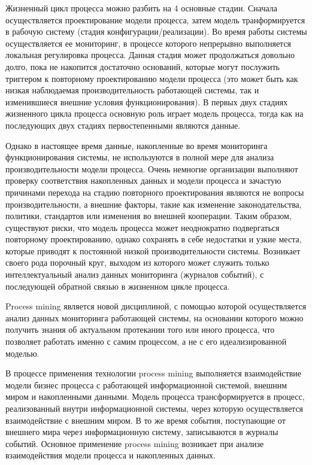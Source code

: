 \documentclass[
11pt,%
tightenlines,%
twoside,%
onecolumn,%
nofloats,%
nobibnotes,%
nofootinbib,%
superscriptaddress,%
noshowpacs,%
centertags]%
{revtex4}
\begin{document}
Жизненный цикл процесса можно разбить на 4 основные стадии.
Сначала осуществляется проектирование модели процесса, затем модель транформируется в рабочую систему (стадия конфигурации/реализации).
Во время работы системы осуществляется ее мониторинг, в процессе которого непрерывно выполняется локальная регулировка процесса.
Данная стадия может продолжаться довольно долго, пока не накопится достаточно оснований, которые могут послужить триггером к повторному проектированию модели процесса (это может быть как низкая наблюдаемая производительность работающей системы, так и изменившиеся внешние условия функционирования).
В первых двух стадиях жизненного цикла процесса основную роль играет модель процесса, тогда как на последующих двух стадиях первостепенными являются данные. 

Однако в настоящее время данные, накопленные во время мониторинга функционирования системы, не используются в полной мере для анализа производительности модели процесса.
Очень немногие организации выполняют проверку соответствия накопленных данных и модели процесса и зачастую причинами перехода на стадию повторного проектирования являются не вопросы производительности, а внешние факторы, такие как изменение законодательства, политики, стандартов или изменения во внешней кооперации.
Таким образом, существуют риски, что модель процесса может неоднократно подвергаться повторному проектированию, однако сохранять в себе недостатки и узкие места, которые приводят к постоянной низкой производительности системы.
Возникает своего рода порочный круг, выходом из которого может служить только интеллектуальный анализ данных мониторинга (журналов событий), с последующей обратной связью в жизненном цикле процесса.

Process mining является новой дисциплиной, с помощью которой осуществляется анализ данных мониторинга работающей системы, на основании которого можно получить знания об актуальном протекании того или иного процесса, что позволяет работать именно с самим процессом, а не с его идеализированной моделью.

В процессе применения технологии process mining выполняется взаимодействие модели бизнес процесса с работающей информационной системой, внешним миром и накопленными данными.
Модель процесса трансформируется в процесс, реализованный внутри информационной системы, через которую осуществляется взаимодействие с внешним миром.
В то же время события, поступающие от внешнего мира через информационную систему, записываются в журналы событий. Основное применение process mining возникает при анализе взаимодействия модели процесса и накопленных данных.
\end{document}
